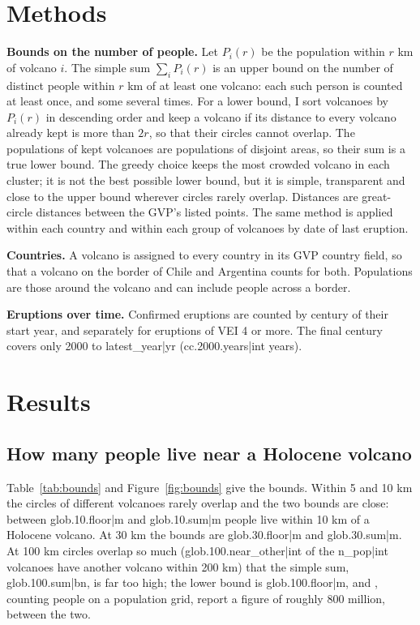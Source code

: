 \documentclass[11pt,a4paper]{article}
\begin{document}
\section{Methods}
\textbf{Bounds on the number of people.} Let $P_i(r)$ be the population within $r$ km of volcano $i$. The simple sum $\sum_i P_i(r)$ is an upper bound on the number of distinct people within $r$ km of at least one volcano: each such person is counted at least once, and some several times. For a lower bound, I sort volcanoes by $P_i(r)$ in descending order and keep a volcano if its distance to every volcano already kept is more than $2r$, so that their circles cannot overlap. The populations of kept volcanoes are populations of disjoint areas, so their sum is a true lower bound. The greedy choice keeps the most crowded volcano in each cluster; it is not the best possible lower bound, but it is simple, transparent and close to the upper bound wherever circles rarely overlap. Distances are great-circle distances between the GVP's listed points. The same method is applied within each country and within each group of volcanoes by date of last eruption.

\textbf{Countries.} A volcano is assigned to every country in its GVP country field, so that a volcano on the border of Chile and Argentina counts for both. Populations are those around the volcano and can include people across a border.

\textbf{Eruptions over time.} Confirmed eruptions are counted by century of their start year, and separately for eruptions of VEI 4 or more. The final century covers only 2000 to {{latest_year|yr}} ({{cc.2000.years|int}} years).

\section{Results}
\subsection{How many people live near a Holocene volcano}
Table~\ref{tab:bounds} and Figure~\ref{fig:bounds} give the bounds. Within 5 and 10 km the circles of different volcanoes rarely overlap and the two bounds are close: between {{glob.10.floor|m}} and {{glob.10.sum|m}} people live within 10 km of a Holocene volcano. At 30 km the bounds are {{glob.30.floor|m}} and {{glob.30.sum|m}}. At 100 km circles overlap so much ({{glob.100.near_other|int}} of the {{n_pop|int}} volcanoes have another volcano within 200 km) that the simple sum, {{glob.100.sum|bn}}, is far too high; the lower bound is {{glob.100.floor|m}}, and \citet{brown2015}, counting people on a population grid, report a figure of roughly 800 million, between the two.
\end{document}
